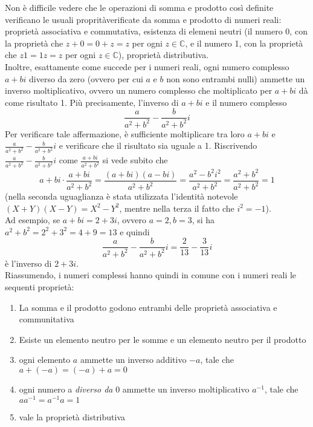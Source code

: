 \begin{oss}
\begin{equation*}
  \end{equation*}
  Non è difficile vedere che le operazioni di somma e prodotto così definite verificano le usuali propritàverificate da somma e prodotto di numeri reali: proprietà associativa e commutativa, esistenza di elemeni neutri (il numero 0, con la proprietà che $z+0=0+z=z$ per ogni $z\in \mathds{C}$, e il numero 1, con la proprietà che $z1=1z=z$ per ogni $z\in \mathds{C}$), proprietà distributiva.\\
  Inoltre, esattamente come succede per i numeri reali, ogni numero complesso $a+bi$ diverso da zero (ovvero per cui $a$ e $b$ non sono entrambi nulli) ammette un inverso moltiplicativo, ovvero un numero complesso che moltiplicato per $a+bi$ dà come risultato 1. Più precisamente, l'inverso di $a+bi$ e il numero complesso
  \begin{equation*}
    \frac{a}{a^2+b^2}-\frac{b}{a^2+b^2}i
  \end{equation*}
  Per verificare tale affermazione, è sufficiente moltiplicare tra loro $a+bi$ e $\frac{a}{a^2+b^2}-\frac{b}{a^2+b^2}i$ e verificare che il risultato sia uguale a 1. Riscrivendo $\frac{a}{a^2+b^2}-\frac{b}{a^2+b^2}i$ come $\frac{a+bi}{a^2+b^2}$ si vede subito che
  \begin{equation*}
    a+bi\cdot \frac{a+bi}{a^2+b^2}= \frac{(a+bi)(a-bi)}{a^2+b^2}=\frac{a^2-b^2i^2}{a^2+b^2}=\frac{a^2+b^2}{a^2+b^2}=1
  \end{equation*}
  (nella seconda uguaglianza è stata utilizzata l'identità notevole $(X+Y)(X-Y)=X^2-Y^2$, mentre nella terza il fatto che $i^2=-1$).\\
  Ad esempio, se $a+bi=2+3i$, ovvero $a=2,b=3$, si ha $a^2+b^2=2^2+3^2=4+9=13$ e quindi
  \begin{equation*}
    \frac{a}{a^2+b^2}-\frac{b}{a^2+b^2}i=\frac{2}{13}-\frac{3}{13}i
  \end{equation*}
  \clearpage
  è l'inverso di $2+3i$.\\
  Riassumendo, i numeri complessi hanno quindi in comune con i numeri reali le sequenti proprietà:
  \begin{enumerate}
  \item La somma e il prodotto godono entrambi delle proprietà associativa e communitativa
  \item Esiste un elemento neutro per le somme e un elemento neutro per il prodotto
  \item ogni elemento $a$ ammette un inverso additivo $-a$, tale che $a+(-a)=(-a)+a=0$
  \item ogni numero a \textit{diverso da} 0 ammette un inverso moltiplicativo $a^{-1}$, tale che $aa^{-1}=a^{-1}a=1$
  \item vale la proprietà distributiva
  \end{enumerate}
\end{oss}
